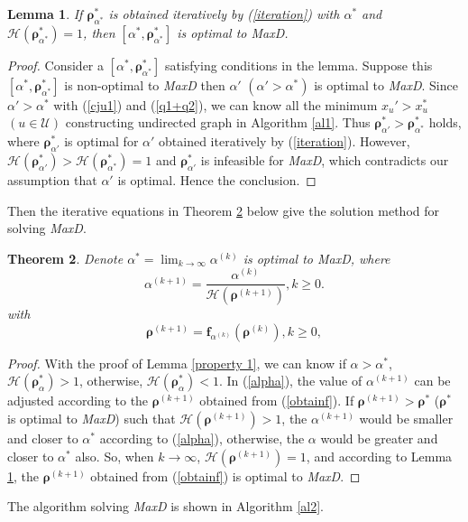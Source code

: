 \documentclass[10pt,journal,final,finalsubmission,twocolumn]{IEEEtran}
\newtheorem{theorem}{Theorem}
\newtheorem{lemma}[theorem]{Lemma}
\begin{document}
 \begin{lemma}\label{property 3}
If $\boldsymbol{\rho}^*_{\alpha^*}$ is obtained iteratively by (\ref{iteration}) with $\alpha^*$ and $\mathcal{H}(\boldsymbol{\rho}^*_{\alpha^*}) = 1$, then $[\alpha^*, \boldsymbol{\rho}^*_{\alpha^*}]$ is optimal to MaxD.
\end{lemma}
\begin{proof}
Consider a $[{\alpha^*}, \boldsymbol{\rho}^*_{\alpha^*}]$ satisfying conditions in the lemma. Suppose this $[{\alpha^*}, \boldsymbol{\rho}^*_{\alpha^*}]$ is non-optimal to {\em MaxD} then $\alpha' $ $(\alpha' > \alpha^*)$ is optimal to {\em MaxD}. Since $\alpha' > \alpha^*$ with (\ref{cju1}) and (\ref{q1+q2}), we can know all the minimum $x_u'> x_u^*$ $(u\in \mathcal{U})$ constructing undirected graph in Algorithm \ref{al1}. Thus $\boldsymbol{\rho}^*_{\alpha'} > \boldsymbol{\rho}^*_{\alpha^*}$ holds, where $\boldsymbol{\rho}^*_{\alpha'} $ is optimal for $\alpha'$ obtained iteratively by (\ref{iteration}). However, $\mathcal{H}(\boldsymbol{\rho}^*_{\alpha'}) >\mathcal{H}(\boldsymbol{\rho}^*_{\alpha^*}) = 1$ and $\boldsymbol{\rho}^*_{\alpha'}$ is infeasible for {\em MaxD}, which contradicts our assumption that $\alpha'$ is optimal. Hence the conclusion.
\end{proof}

Then the iterative equations in Theorem \ref{canbisection} below give the solution method for solving {\em MaxD}.


\begin{theorem}\label{canbisection}
Denote $\alpha^*=\lim_{k\rightarrow \infty }\alpha^{(k)}$ is optimal to  MaxD, where 
\begin{equation}\label{alpha}
\alpha ^{\left(k+1\right)} = \frac{\alpha ^{(k)}} { \mathcal{H}\left(\boldsymbol{\rho}^{(k+1)}\right)},k\geq0.
\end{equation}
with
\begin{equation}\label{obtainf}
\boldsymbol{\rho}^{\left(k+1\right)} =\boldsymbol{f}_{\alpha^{(k)}}\left(\boldsymbol{\rho}^{(k)}\right),k\geq0,
\end{equation}
\end{theorem}
\begin{proof}
With the proof of Lemma \ref{property 1}, we can know if $\alpha >\alpha^*$, $\mathcal{H}(\boldsymbol{\rho}^*_{\alpha}) > 1$, otherwise, $\mathcal{H}(\boldsymbol{\rho}^*_{\alpha}) < 1$. In (\ref{alpha}), the value of $\alpha^{(k+1)} $ can be adjusted according to the $\boldsymbol{\rho}^{(k+1)}$ obtained from (\ref{obtainf}). If $\boldsymbol{\rho}^{(k+1)} > \boldsymbol{\rho}^*$ ($\boldsymbol{\rho}^*$ is optimal to {\em MaxD}) such that $\mathcal{H}\left(\boldsymbol{\rho}^{(k+1)}\right) > 1$, the $\alpha^{(k+1)}$ would be smaller and closer to $\alpha^*$ according to (\ref{alpha}), otherwise, the $\alpha$ would be greater and closer to $\alpha^*$ also. So, when $k\rightarrow \infty $, $\mathcal{H}\left(\boldsymbol{\rho}^{(k+1)}\right) = 1$, and according to Lemma \ref{property 3}, the $\boldsymbol{\rho}^{(k+1)}$ obtained from (\ref{obtainf}) is optimal to {\em MaxD}. 
\end{proof}
The algorithm solving {\em MaxD} is shown in Algorithm \ref{al2}.
\end{document}
